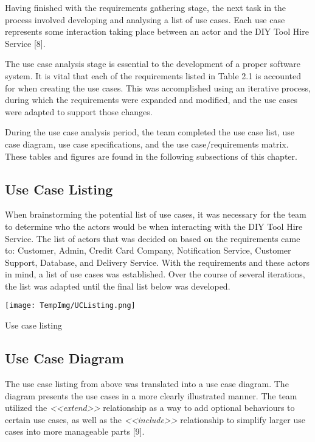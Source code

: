 \documentclass[fontsize=11pt]{extarticle}
\numberwithin{figure}{section} %
\numberwithin{table}{section}%
\begin{document}
Having finished with the requirements gathering stage, the next task in
the process involved developing and analysing a list of use cases. Each
use case represents some interaction taking place between an actor and
the DIY Tool Hire Service {[}8{]}.

The use case analysis stage is essential to the development of a proper
software system. It is vital that each of the requirements listed in
Table 2.1 is accounted for when creating the use cases. This was
accomplished using an iterative process, during which the requirements
were expanded and modified, and the use cases were adapted to support
those changes.

During the use case analysis period, the team completed the use case
list, use case diagram, use case specifications, and the use
case/requirements matrix. These tables and figures are found in the
following subsections of this chapter.

\hypertarget{use-case-listing}{%
\subsection{Use Case Listing}\label{use-case-listing}}

When brainstorming the potential list of use cases, it was necessary for
the team to determine who the actors would be when interacting with the
DIY Tool Hire Service. The list of actors that was decided on based on
the requirements came to: Customer, Admin, Credit Card Company,
Notification Service, Customer Support, Database, and Delivery Service.
With the requirements and these actors in mind, a list of use cases was
established. Over the course of several iterations, the list was adapted
until the final list below was developed.

\begin{table}[H]
      \centering
      \texttt{[image: TempImg/UCListing.png]}
      \caption{Use case listing}
 \end{table}

\hypertarget{use-case-diagram}{%
\subsection{Use Case Diagram}\label{use-case-diagram}}

The use case listing from above was translated into a use case diagram.
The diagram presents the use cases in a more clearly illustrated manner.
The team utilized the \textit{<<extend>>} relationship as a way to add
optional behaviours to certain use cases, as well as the
\textit{<<include>>} relationship to simplify larger use cases into more
manageable parts {[}9{]}.
\end{document}

